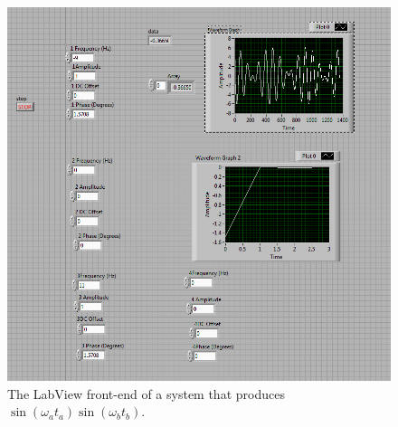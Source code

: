 \documentclass{article}
\theoremstyle{plain}
\theoremstyle{definition}
\theoremstyle{remark}
\begin{document}
\begin{figure}[h]
\begin{center}
\includegraphics[width=15cm]{problem2_h.png}
\end{center}
\caption{The LabView front-end of a system that produces $\sin(\omega_a t_a)\sin(\omega_b t_b) $.}
\label{q2_a}
\end{figure}
\end{document}
